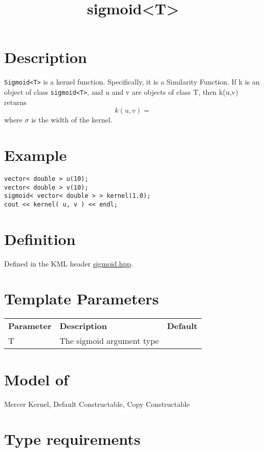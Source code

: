 \documentclass{article}
\begin{document}
\title{sigmoid<T>}
\maketitle

\section*{Description}

\texttt{Sigmoid<T>} is a kernel function. Specifically, it is a Similarity Function. If k is an object of class \texttt{sigmoid<T>}, and u and v are objects of class T, then k(u,v) returns
%
$$k(u,v) =  $$
%
where $\sigma$ is the width of the kernel. 


\section*{Example}


\highlightcpp{}
\begin{verbatim}
vector< double > u(10);
vector< double > v(10);
sigmoid< vector< double > > kernel(1.0);
cout << kernel( u, v ) << endl;
\end{verbatim}


\section*{Definition}

Defined in the KML header \href{sigmoid.hpp}{sigmoid.hpp}.


\section*{Template Parameters}

\begin{tabular}{lll}
\textbf{Parameter} & \textbf{Description} & \textbf{Default} \\ 
T & The sigmoid argument type \\ 
\end{tabular}


\section*{Model of}

Mercer Kernel, Default Constructable, Copy Constructable


\section*{Type requirements}
\end{document}
